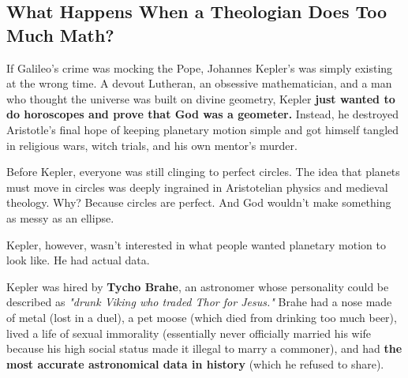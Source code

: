 \subsection{What Happens When a Theologian Does Too Much Math?}

If Galileo’s crime was mocking the Pope, Johannes Kepler’s was simply existing at the wrong time. A devout Lutheran, an obsessive mathematician, and a man who thought the universe was built on divine geometry, Kepler \textbf{just wanted to do horoscopes and prove that God was a geometer.} Instead, he destroyed Aristotle’s final hope of keeping planetary motion simple and got himself tangled in religious wars, witch trials, and his own mentor’s murder.

Before Kepler, everyone was still clinging to perfect circles. The idea that planets must move in circles was deeply ingrained in Aristotelian physics and medieval theology. Why? Because circles are perfect. And God wouldn’t make something as messy as an ellipse.

Kepler, however, wasn’t interested in what people wanted planetary motion to look like. He had actual data.

Kepler was hired by \textbf{Tycho Brahe}, an astronomer whose personality could be described as \textit{"drunk Viking who traded Thor for Jesus."} Brahe had a nose made of metal (lost in a duel), a pet moose (which died from drinking too much beer), lived a life of sexual immorality (essentially never officially married his wife because his high social status made it illegal to marry a commoner),  and had \textbf{the most accurate astronomical data in history} (which he refused to share).

\medskip

